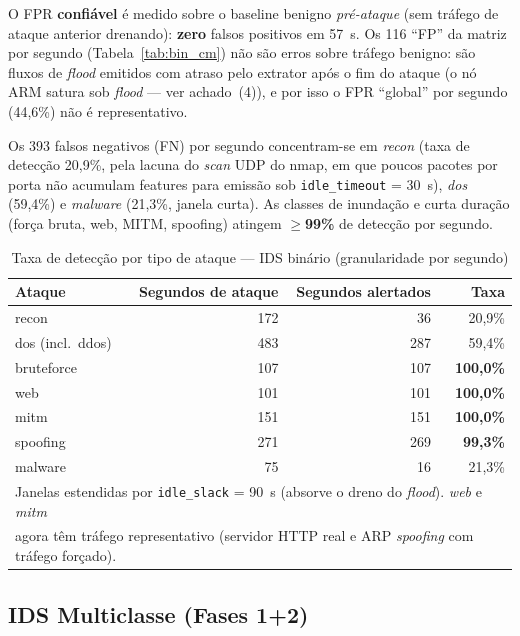 \documentclass[12pt]{article}
\begin{document}
\noindent O FPR \textbf{confiável} é medido sobre o baseline benigno
\textit{pré-ataque} (sem tráfego de ataque anterior drenando): \textbf{zero}
falsos positivos em 57~s. Os 116 ``FP'' da matriz por segundo
(Tabela~\ref{tab:bin_cm}) não são erros sobre tráfego benigno: são fluxos de
\textit{flood} emitidos com atraso pelo extrator após o fim do ataque (o nó ARM
satura sob \textit{flood} — ver achado~(4)), e por isso o FPR ``global'' por
segundo (44,6\%) não é representativo.

Os 393 falsos negativos (FN) por segundo concentram-se em \textit{recon}
(taxa de detecção 20,9\%, pela lacuna do \textit{scan} UDP do nmap, em que poucos
pacotes por porta não acumulam features para emissão sob \texttt{idle\_timeout}
= 30~s), \textit{dos} (59,4\%) e \textit{malware} (21,3\%, janela curta). As
classes de inundação e curta duração (força bruta, web, MITM, spoofing) atingem
$\geq$\textbf{99\%} de detecção por segundo.

\begin{table}[ht]
\centering
\caption{Taxa de detecção por tipo de ataque — IDS binário (granularidade por segundo)}
\label{tab:detection_rate}
\begin{tabular}{@{}lrrr@{}}
\toprule
\textbf{Ataque} & \textbf{Segundos de ataque} & \textbf{Segundos alertados} & \textbf{Taxa} \\ \midrule
recon             &  172 &  36 & 20,9\% \\
dos (incl.\ ddos) &  483 & 287 & 59,4\% \\
bruteforce        &  107 & 107 & \textbf{100,0\%} \\
web               &  101 & 101 & \textbf{100,0\%} \\
mitm              &  151 & 151 & \textbf{100,0\%} \\
spoofing          &  271 & 269 & \textbf{99,3\%} \\
malware           &   75 &  16 & 21,3\% \\ \bottomrule
\multicolumn{4}{l}{\small Janelas estendidas por \texttt{idle\_slack} = 90~s
                   (absorve o dreno do \textit{flood}). \textit{web} e \textit{mitm}} \\
\multicolumn{4}{l}{\small agora têm tráfego representativo (servidor HTTP real e
                   ARP \textit{spoofing} com tráfego forçado).}
\end{tabular}
\end{table}

\subsection{IDS Multiclasse (Fases 1+2)}
\end{document}

